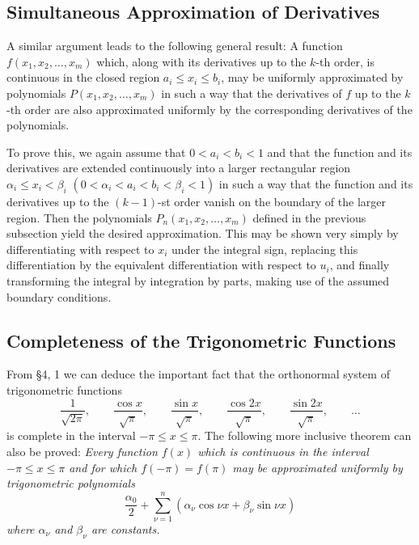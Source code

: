 \subsection{Simultaneous Approximation of Derivatives}
A similar argument leads to the following general result: A function $f(x_1,x_2,\ldots,x_m)$ which, along with its derivatives up to the $k$-th order, is continuous in the closed region $a_i\le x_i\le b_i$, may be uniformly approximated by polynomials $P(x_1,x_2,\ldots,x_m)$ in such a way that the derivatives of $f$ up to the $k$-th order are also approximated uniformly by the corresponding derivatives of the polynomials.

To prove this, we again assume that $0<a_i<b_i<1$ and that the function and its derivatives are extended continuously into a larger rectangular region $\alpha_i\le x_i<\beta_i$ $(0<\alpha_i<a_i<b_i<\beta_i<1)$ in such a way that the function and its derivatives up to the $(k-1)$-st order vanish on the boundary of the larger region. Then the polynomials $P_n(x_1,x_2,\ldots,x_m)$ defined in the previous subsection yield the desired approximation. This may be shown very simply by differentiating with respect to $x_i$ under the integral sign, replacing this differentiation by the equivalent differentiation with respect to $u_i$, and finally transforming the integral by integration by parts, making use of the assumed boundary conditions.

\subsection{Completeness of the Trigonometric Functions}
From \S4, 1 we can deduce the important fact that the orthonormal system of trigonometric functions
\begin{equation}
\frac{1}{\sqrt{2\pi}},\qquad
\frac{\cos x}{\sqrt{\pi}},\qquad
\frac{\sin x}{\sqrt{\pi}},\qquad
\frac{\cos 2x}{\sqrt{\pi}},\qquad
\frac{\sin 2x}{\sqrt{\pi}},\qquad\ldots
\tag{14}
\end{equation}
is complete in the interval $-\pi\le x\le\pi$. The following more inclusive theorem can also be proved: \emph{Every function $f(x)$ which is continuous in the interval $-\pi\le x\le\pi$ and for which $f(-\pi)=f(\pi)$ may be approximated uniformly by trigonometric polynomials}
\[
\frac{\alpha_0}{2}+\sum_{\nu=1}^{n}(\alpha_\nu\cos\nu x+\beta_\nu\sin\nu x)
\]
\emph{where $\alpha_\nu$ and $\beta_\nu$ are constants.}

